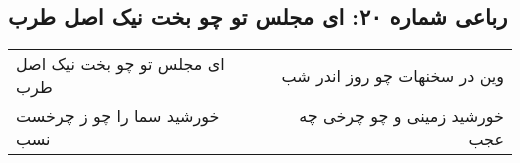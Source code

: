 \begin{center}
\section*{رباعی شماره ۲۰: ای مجلس تو چو بخت نیک اصل طرب}
\label{sec:sh020}
\begin{longtable}{l p{0.5cm} r}
ای مجلس تو چو بخت نیک اصل طرب
&&
وین در سخنهات چو روز اندر شب
\\
خورشید سما را چو ز چرخست نسب
&&
خورشید زمینی و چو چرخی چه عجب
\\
\end{longtable}
\end{center}
